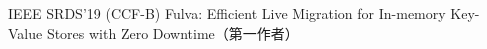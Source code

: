 \cvpub
{IEEE SRDS'19 (CCF-B)} %
{Fulva: Efficient Live Migration for In-memory Key-Value Stores with Zero Downtime（第一作者）} %
{} %
{} %
{ %
}

